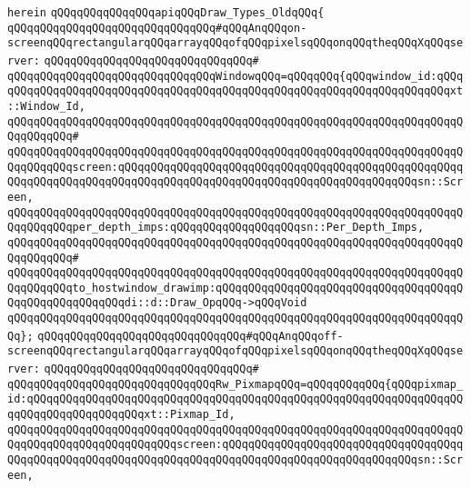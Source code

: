 \verb|herein|\newline
\newline
\verb|qQQqqQQqqQQqqQQqapiqQQqDraw_Types_OldqQQq{|\newline
\newline
\verb|qQQqqQQqqQQqqQQqqQQqqQQqqQQqqQQq#qQQqAnqQQqon-screenqQQqrectangularqQQqarrayqQQqofqQQqpixelsqQQqonqQQqtheqQQqXqQQqserver:|\newline
\verb|qQQqqQQqqQQqqQQqqQQqqQQqqQQqqQQq#|\newline
\verb|qQQqqQQqqQQqqQQqqQQqqQQqqQQqqQQqWindowqQQq=qQQqqQQq{qQQqwindow_id:qQQqqQQqqQQqqQQqqQQqqQQqqQQqqQQqqQQqqQQqqQQqqQQqqQQqqQQqqQQqqQQqqQQqqQQqxt::Window_Id,|\newline
\verb|qQQqqQQqqQQqqQQqqQQqqQQqqQQqqQQqqQQqqQQqqQQqqQQqqQQqqQQqqQQqqQQqqQQqqQQqqQQqqQQq#|\newline
\verb|qQQqqQQqqQQqqQQqqQQqqQQqqQQqqQQqqQQqqQQqqQQqqQQqqQQqqQQqqQQqqQQqqQQqqQQqqQQqqQQqscreen:qQQqqQQqqQQqqQQqqQQqqQQqqQQqqQQqqQQqqQQqqQQqqQQqqQQqqQQqqQQqqQQqqQQqqQQqqQQqqQQqqQQqqQQqqQQqqQQqqQQqqQQqqQQqqQQqqQQqsn::Screen,|\newline
\verb|qQQqqQQqqQQqqQQqqQQqqQQqqQQqqQQqqQQqqQQqqQQqqQQqqQQqqQQqqQQqqQQqqQQqqQQqqQQqqQQqper_depth_imps:qQQqqQQqqQQqqQQqqQQqsn::Per_Depth_Imps,|\newline
\verb|qQQqqQQqqQQqqQQqqQQqqQQqqQQqqQQqqQQqqQQqqQQqqQQqqQQqqQQqqQQqqQQqqQQqqQQqqQQqqQQq#|\newline
\verb|qQQqqQQqqQQqqQQqqQQqqQQqqQQqqQQqqQQqqQQqqQQqqQQqqQQqqQQqqQQqqQQqqQQqqQQqqQQqqQQqto_hostwindow_drawimp:qQQqqQQqqQQqqQQqqQQqqQQqqQQqqQQqqQQqqQQqqQQqqQQqqQQqqQQqdi::d::Draw_OpqQQq->qQQqVoid|\newline
\verb|qQQqqQQqqQQqqQQqqQQqqQQqqQQqqQQqqQQqqQQqqQQqqQQqqQQqqQQqqQQqqQQqqQQqqQQq};|\newline
\newline
\verb|qQQqqQQqqQQqqQQqqQQqqQQqqQQqqQQq#qQQqAnqQQqoff-screenqQQqrectangularqQQqarrayqQQqofqQQqpixelsqQQqonqQQqtheqQQqXqQQqserver:|\newline
\verb|qQQqqQQqqQQqqQQqqQQqqQQqqQQqqQQq#|\newline
\verb|qQQqqQQqqQQqqQQqqQQqqQQqqQQqqQQqRw_PixmapqQQq=qQQqqQQqqQQq{qQQqpixmap_id:qQQqqQQqqQQqqQQqqQQqqQQqqQQqqQQqqQQqqQQqqQQqqQQqqQQqqQQqqQQqqQQqqQQqqQQqqQQqqQQqqQQqqQQqxt::Pixmap_Id,|\newline
\verb|qQQqqQQqqQQqqQQqqQQqqQQqqQQqqQQqqQQqqQQqqQQqqQQqqQQqqQQqqQQqqQQqqQQqqQQqqQQqqQQqqQQqqQQqqQQqqQQqscreen:qQQqqQQqqQQqqQQqqQQqqQQqqQQqqQQqqQQqqQQqqQQqqQQqqQQqqQQqqQQqqQQqqQQqqQQqqQQqqQQqqQQqqQQqqQQqqQQqqQQqsn::Screen,|\newline
